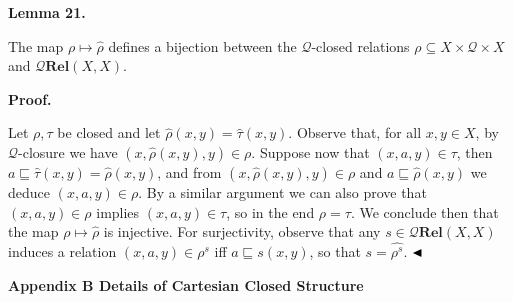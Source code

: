 \documentclass[10pt,a4paper]{amsart}
\begin{document}
 
 
\par\medskip\noindent\textbf{Lemma 21.}\par
 
 
The map $\rho\mapsto\widehat{\rho}$ defines a bijection between the $\mathcal{Q}$-closed relations $\rho\subseteq X\times\mathcal{Q}\times X$ and $\mathcal{Q}\mathbf{Rel}(X,X)$.\par
 
 
 
 
 
\par\medskip\noindent\textbf{Proof.}\par
 
 
Let $\rho,\tau$ be closed and let $\widehat{\rho}(x,y)=\widehat{\tau}(x,y)$. Observe that, for all $x,y\in X$, by $\mathcal{Q}$-closure we have $(x,\widehat{\rho}(x,y),y)\in\rho$. Suppose now that $(x,a,y)\in\tau$, then $a\sqsubseteq\widehat{\tau}(x,y)=\widehat{\rho}(x,y)$, and from $(x,\widehat{\rho}(x,y),y)\in\rho$ and $a\sqsubseteq\widehat{\rho}(x,y)$ we deduce $(x,a,y)\in\rho$. By a similar argument we can also prove that $(x,a,y)\in\rho$ implies $(x,a,y)\in\tau$, so in the end $\rho=\tau$. We conclude then that the map $\rho\mapsto\widehat{\rho}$ is injective. For surjectivity, observe that any $s\in\mathcal{Q}\mathbf{Rel}(X,X)$ induces a relation $(x,a,y)\in\rho^{s}$ iff $a\sqsubseteq s(x,y)$, so that $s=\widehat{\rho^{s}}$. $\hfill\blacktriangleleft$\par
 
 
 


 
\par\medskip\noindent\textbf{Appendix B Details of Cartesian Closed Structure}\par
 
 
\end{document}
